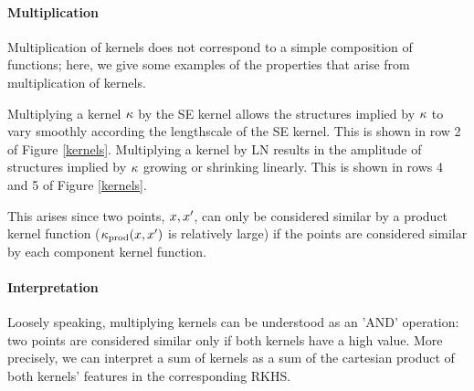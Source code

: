 \documentclass[twoside]{article}
\begin{document}
\paragraph{Multiplication}

Multiplication of kernels does not correspond to a simple composition of functions; here, we give some examples of the properties that arise from multiplication of kernels.

%
%

Multiplying a kernel $\kappa$ by the SE kernel allows the structures implied by $\kappa$ to vary smoothly according the lengthscale of the SE kernel.  This is shown in row 2 of Figure \ref{kernels}.
Multiplying a kernel by LN results in the amplitude of structures implied by $\kappa$ growing or shrinking linearly. This is shown in rows 4 and 5 of Figure \ref{kernels}.
%

This arises since two points, $x,x'$, can only be considered similar by a product kernel function (\ie $\kappa_\textrm{prod}(x,x')$ is relatively large) if the points are considered similar by each component kernel function.

\paragraph{Interpretation}
Loosely speaking, multiplying kernels can be understood as an 'AND' operation: two points are considered similar only if both kernels have a high value.
More precisely, we can interpret a sum of kernels as a sum of the cartesian product of both kernels' features in the corresponding RKHS.
\end{document}
